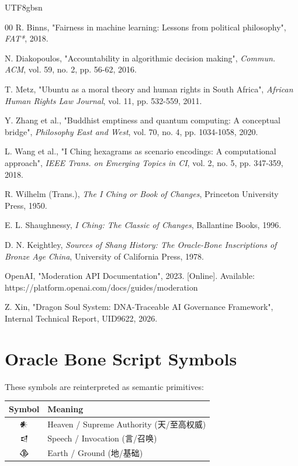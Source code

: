 \documentclass[conference]{IEEEtran}
\begin{document}
\begin{CJK}{UTF8}{gbsn}
\begin{thebibliography}{00}
 R. Binns, "Fairness in machine learning: Lessons from political philosophy", \textit{FAT*}, 2018.

 N. Diakopoulos, "Accountability in algorithmic decision making", \textit{Commun. ACM}, vol. 59, no. 2, pp. 56-62, 2016.

 T. Metz, "Ubuntu as a moral theory and human rights in South Africa", \textit{African Human Rights Law Journal}, vol. 11, pp. 532-559, 2011.

 Y. Zhang et al., "Buddhist emptiness and quantum computing: A conceptual bridge", \textit{Philosophy East and West}, vol. 70, no. 4, pp. 1034-1058, 2020.

 L. Wang et al., "I Ching hexagrams as scenario encodings: A computational approach", \textit{IEEE Trans. on Emerging Topics in CI}, vol. 2, no. 5, pp. 347-359, 2018.

 R. Wilhelm (Trans.), \textit{The I Ching or Book of Changes}, Princeton University Press, 1950.

 E. L. Shaughnessy, \textit{I Ching: The Classic of Changes}, Ballantine Books, 1996.

 D. N. Keightley, \textit{Sources of Shang History: The Oracle-Bone Inscriptions of Bronze Age China}, University of California Press, 1978.

 OpenAI, "Moderation API Documentation", 2023. [Online]. Available: https://platform.openai.com/docs/guides/moderation

 Z. Xin, "Dragon Soul System: DNA-Traceable AI Governance Framework", Internal Technical Report, UID9622, 2026.

\end{thebibliography}

\appendices

\section{Oracle Bone Script Symbols}

These symbols are reinterpreted as semantic primitives:

\begin{table}[h]
\centering
\begin{tabular}{cl}
\toprule
\textbf{Symbol} & \textbf{Meaning} \\
\midrule
𒀭 & Heaven / Supreme Authority (天/至高权威) \\
𒁀 & Speech / Invocation (言/召唤) \\
𒆠 & Earth / Ground (地/基础) \\
\bottomrule
\end{tabular}
\end{table}


\end{CJK}
\end{document}
